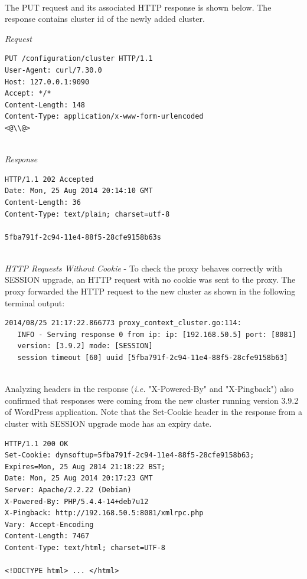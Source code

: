 \documentclass[a4paper,11pt,twoside]{report}
\begin{document}
\noindent\\
The PUT request and its associated HTTP response is shown below. The response contains cluster id of the newly added cluster.\smallskip 

\noindent
\textit{Request}
\begin{lstlisting}[language=terminal]
PUT /configuration/cluster HTTP/1.1
User-Agent: curl/7.30.0
Host: 127.0.0.1:9090
Accept: */*
Content-Length: 148
Content-Type: application/x-www-form-urlencoded
<@\\@>
\end{lstlisting}

\noindent\\
\textit{Response}
\begin{lstlisting}[language=terminal]
HTTP/1.1 202 Accepted
Date: Mon, 25 Aug 2014 20:14:10 GMT
Content-Length: 36
Content-Type: text/plain; charset=utf-8

5fba791f-2c94-11e4-88f5-28cfe9158b63s
\end{lstlisting}  

\noindent\\
\textit{HTTP Requests Without Cookie} - To check the proxy behaves correctly with SESSION upgrade, an HTTP request with no cookie was sent to the proxy. The proxy forwarded the HTTP request to the new cluster as shown in the following terminal output: \smallskip   

\begin{lstlisting}[language=terminal]
2014/08/25 21:17:22.866773 proxy_context_cluster.go:114:     
   INFO - Serving response 0 from ip: ip: [192.168.50.5] port: [8081] 
   version: [3.9.2] mode: [SESSION] 
   session timeout [60] uuid [5fba791f-2c94-11e4-88f5-28cfe9158b63]
\end{lstlisting}

\noindent\\
Analyzing headers in the response (\textit{i.e.} "X-Powered-By" and "X-Pingback") also confirmed that responses were coming from the new cluster running version 3.9.2 of WordPress application. Note that the Set-Cookie header in the response from a cluster with SESSION upgrade mode has an expiry date. \smallskip 

\begin{lstlisting}[language=terminal]
HTTP/1.1 200 OK
Set-Cookie: dynsoftup=5fba791f-2c94-11e4-88f5-28cfe9158b63; Expires=Mon, 25 Aug 2014 21:18:22 BST;
Date: Mon, 25 Aug 2014 20:17:23 GMT
Server: Apache/2.2.22 (Debian)
X-Powered-By: PHP/5.4.4-14+deb7u12
X-Pingback: http://192.168.50.5:8081/xmlrpc.php
Vary: Accept-Encoding
Content-Length: 7467
Content-Type: text/html; charset=UTF-8

<!DOCTYPE html> ... </html>
\end{lstlisting}
\end{document}
